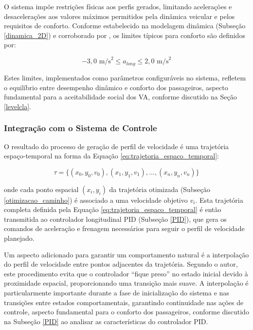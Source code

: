 O sistema impõe restrições físicas aos perfis gerados, limitando acelerações e desacelerações aos valores máximos permitidos pela dinâmica veicular e pelos requisitos de conforto. Conforme estabelecido na modelagem dinâmica (Subseção \ref{dinamica_2D}) e corroborado por , os limites típicos para conforto são definidos por:

\begin{equation}\label{eq:limites_aceleracao}
-3,0 \text{ m/s}^2 \leq a_{long} \leq 2,0 \text{ m/s}^2
\end{equation}

Estes limites, implementados como parâmetros configuráveis no sistema, refletem o equilíbrio entre desempenho dinâmico e conforto dos passageiros, aspecto fundamental para a aceitabilidade social dos VA, conforme discutido na Seção \ref{levelcla}.

\subsubsection{Integração com o Sistema de Controle}

O resultado do processo de geração de perfil de velocidade é uma trajetória espaço-temporal na forma da Equação \ref{eq:trajetoria_espaco_temporal}:

\begin{equation}\label{eq:trajetoria_espaco_temporal}
\tau = \{(x_0, y_0, v_0), (x_1, y_1, v_1), ..., (x_n, y_n, v_n)\}
\end{equation}

onde cada ponto espacial $(x_i, y_i)$ da trajetória otimizada (Subseção \ref{otimizacao_caminho}) é associado a uma velocidade objetivo $v_i$. Esta trajetória completa definida pela Equação \ref{eq:trajetoria_espaco_temporal} é então transmitida ao controlador longitudinal PID (Subseção \ref{PID}), que gera os comandos de aceleração e frenagem necessários para seguir o perfil de velocidade planejado.

Um aspecto adicionado para garantir um comportamento natural é a interpolação do perfil de velocidade entre pontos adjacentes da trajetória. Segundo o autor,  este procedimento evita que o controlador “fique preso” no estado inicial devido à proximidade espacial, proporcionando uma transição mais suave. A interpolação é particularmente importante durante a fase de inicialização do sistema e nas transições entre estados comportamentais, garantindo continuidade nas ações de controle, aspecto fundamental para o conforto dos passageiros, conforme discutido na Subseção \ref{PID} ao analisar as características do controlador PID.

